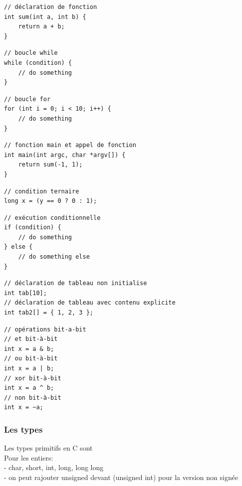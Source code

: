 \documentclass[a4paper,10pt]{article} %
\begin{document}
\begin{multicols}{2}
\begin{lstlisting}[frame=single]
// déclaration de fonction
int sum(int a, int b) {
    return a + b;
}
\end{lstlisting}

\begin{lstlisting}[frame=single]
// boucle while
while (condition) {
    // do something
}
\end{lstlisting}

\begin{lstlisting}[frame=single]
// boucle for
for (int i = 0; i < 10; i++) {
    // do something
}
\end{lstlisting}

\begin{lstlisting}[frame=single]
// fonction main et appel de fonction
int main(int argc, char *argv[]) {
    return sum(-1, 1);
}
\end{lstlisting}

\begin{lstlisting}[frame=single]
// condition ternaire
long x = (y == 0 ? 0 : 1);
\end{lstlisting}

\begin{lstlisting}[frame=single]
// exécution conditionnelle
if (condition) {
    // do something
} else {
    // do something else
}
\end{lstlisting}

\begin{lstlisting}[frame=single]
// déclaration de tableau non initialise
int tab[10];
// déclaration de tableau avec contenu explicite
int tab2[] = { 1, 2, 3 };
\end{lstlisting}

\begin{lstlisting}[frame=single]
// opérations bit-a-bit
// et bit-à-bit
int x = a & b;
// ou bit-à-bit
int x = a | b;
// xor bit-à-bit
int x = a ^ b;
// non bit-à-bit
int x = ~a;
\end{lstlisting}

\end{multicols}

\subsubsection{Les types}
Les types primitifs en C sont\\

Pour les entiers:\\
- char, short, int, long, long long\\
- on peut rajouter unsigned devant (unsigned int) pour la version non signée\\
\end{document}
